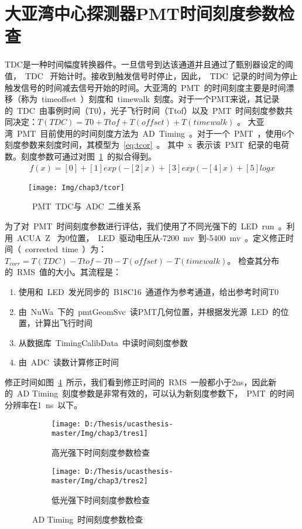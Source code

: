 \section{大亚湾中心探测器PMT时间刻度参数检查}
TDC是一种时间幅度转换器件。一旦信号到达该通道并且通过了甄别器设定的阈值，~TDC~ 开始计时。接收到触发信号时停止，因此，~TDC~记录的时间为停止触发信号的时间减去信号开始的时间。大亚湾的~PMT~的时间刻度主要是时间漂移（称为~timeoffset~）刻度和~timewalk~刻度。对于一个PMT来说，其记录的~TDC~由事例时间（T0），光子飞行时间（Ttof）以及~PMT~时间刻度参数共同决定：$ T(TDC)=T0+Ttof+T(offset)+T(timewalk) $ 。 大亚湾~PMT~目前使用的时间刻度方法为~AD~Timing~。对于一个~PMT~，使用6个刻度参数来刻度时间，其模型为~\ref{eq:tcor}~。 其中~x~表示该~PMT~纪录的电荷数。刻度参数可通过对图~\ref{fig:tcor}~的拟合得到。
\begin{eqnarray}\label{eq:tcor}
f(x) = [0]+[1]exp(-[2]x)+[3]exp(-[4]x)+[5]logx
\end{eqnarray}
\begin{figure}[!htb]
  \centering
   \texttt{[image: Img/chap3/tcor]}
    \caption{~PMT~TDC与~ADC~二维关系}
  \label{fig:tcor}
\end{figure}
为了对~PMT~时间刻度参数进行评估，我们使用了不同光强下的~LED~run~。利用~ACUA~Z~ 为0位置，~LED~驱动电压从-7200~mv~到-5400~mv~。定义修正时间（~corrected~time~）为：$T_{corr}=T(TDC)-Ttof-T0-T(offset)-T(timewalk)$。 检查其分布的~RMS~值的大小。其流程是：
 \begin{enumerate}
\item 使用和~LED~发光同步的~B18C16~通道作为参考通道，给出参考时间T0
\item 由~NuWa~下的~pmtGeomSvc~读PMT几何位置，并根据发光源~LED~的位置，计算出飞行时间
\item 从数据库~TimingCalibData~中读时间刻度参数
\item 由~ADC~读数计算修正时间
\end{enumerate}
修正时间如图~\ref{fig:tres}~所示，我们看到修正时间的~RMS~一般都小于2ns，因此新的~AD Timing~刻度参数是非常有效的，可以认为新刻度参数下，~PMT~的时间分辨率在1~ns~以下。
\begin{figure}[!htb]
  \centering
  \begin{subfigure}[b]{\MySubFactor\textwidth}
    \texttt{[image: D:/Thesis/ucasthesis-master/Img/chap3/tres1]}
    \caption{高光强下时间刻度参数检查}
    \label{fig:tres_1}
  \end{subfigure}%
  \quad\quad\quad\quad%
  \begin{subfigure}[b]{\MySubFactor\textwidth}
    \texttt{[image: D:/Thesis/ucasthesis-master/Img/chap3/tres2]}
    \caption{ 低光强下时间刻度参数检查}
    \label{fig:tres_2}
  \end{subfigure}
  \caption{~AD Timing~时间刻度参数检查}
  \label{fig:tres}
\end{figure}

